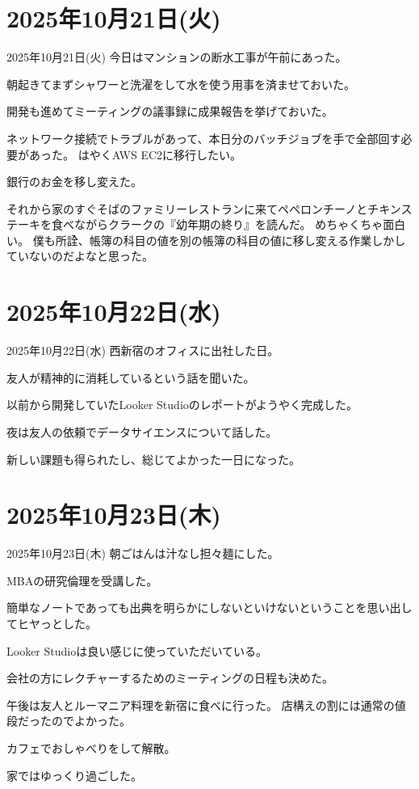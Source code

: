 \documentclass[dvipdfmx, autodetect-engine, aspectratio=169, 10.5pt]{beamer}
\begin{document}
\section{2025年10月21日(火)}

\begin{frame}{2025年10月21日(火)}
	今日はマンションの断水工事が午前にあった。

	朝起きてまずシャワーと洗濯をして水を使う用事を済ませておいた。

	開発も進めてミーティングの議事録に成果報告を挙げておいた。

	ネットワーク接続でトラブルがあって、本日分のバッチジョブを手で全部回す必要があった。
	はやくAWS EC2に移行したい。

	銀行のお金を移し変えた。

	それから家のすぐそばのファミリーレストランに来てペペロンチーノとチキンステーキを食べながらクラークの『幼年期の終り』を読んだ。
	めちゃくちゃ面白い。
	僕も所詮、帳簿の科目の値を別の帳簿の科目の値に移し変える作業しかしていないのだよなと思った。
\end{frame}

\section{2025年10月22日(水)}

\begin{frame}{2025年10月22日(水)}
	西新宿のオフィスに出社した日。

	友人が精神的に消耗しているという話を聞いた。

	以前から開発していたLooker Studioのレポートがようやく完成した。

	夜は友人の依頼でデータサイエンスについて話した。

	新しい課題も得られたし、総じてよかった一日になった。
\end{frame}

\section{2025年10月23日(木)}

\begin{frame}{2025年10月23日(木)}
	朝ごはんは汁なし担々麺にした。

	MBAの研究倫理を受講した。

	簡単なノートであっても出典を明らかにしないといけないということを思い出してヒヤっとした。

	Looker Studioは良い感じに使っていただいている。

	会社の方にレクチャーするためのミーティングの日程も決めた。

	午後は友人とルーマニア料理を新宿に食べに行った。
	店構えの割には通常の値段だったのでよかった。

	カフェでおしゃべりをして解散。

	家ではゆっくり過ごした。
\end{frame}
\end{document}
